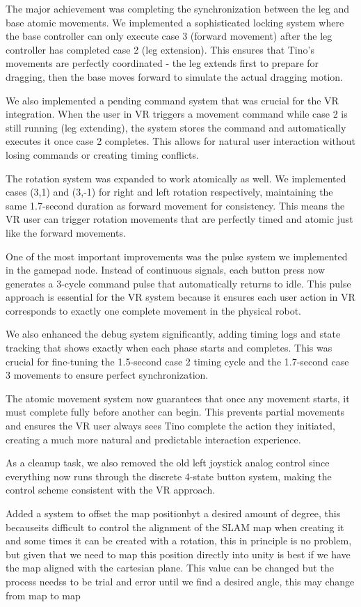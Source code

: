 The major achievement was completing the synchronization between the leg and base atomic movements. We implemented a sophisticated locking system where the base controller can only execute case 3 (forward movement) after the leg controller has completed case 2 (leg extension). This ensures that Tino's movements are perfectly coordinated - the leg extends first to prepare for dragging, then the base moves forward to simulate the actual dragging motion.

We also implemented a pending command system that was crucial for the VR integration. When the user in VR triggers a movement command while case 2 is still running (leg extending), the system stores the command and automatically executes it once case 2 completes. This allows for natural user interaction without losing commands or creating timing conflicts.

The rotation system was expanded to work atomically as well. We implemented cases (3,1) and (3,-1) for right and left rotation respectively, maintaining the same 1.7-second duration as forward movement for consistency. This means the VR user can trigger rotation movements that are perfectly timed and atomic just like the forward movements.

One of the most important improvements was the pulse system we implemented in the gamepad node. Instead of continuous signals, each button press now generates a 3-cycle command pulse that automatically returns to idle. This pulse approach is essential for the VR system because it ensures each user action in VR corresponds to exactly one complete movement in the physical robot.

We also enhanced the debug system significantly, adding timing logs and state tracking that shows exactly when each phase starts and completes. This was crucial for fine-tuning the 1.5-second case 2 timing cycle and the 1.7-second case 3 movements to ensure perfect synchronization.

The atomic movement system now guarantees that once any movement starts, it must complete fully before another can begin. This prevents partial movements and ensures the VR user always sees Tino complete the action they initiated, creating a much more natural and predictable interaction experience.

As a cleanup task, we also removed the old left joystick analog control since everything now runs through the discrete 4-state button system, making the control scheme consistent with the VR approach.


Added a system to offset the map positionbyt a desired amount of degree, this becauseits difficult to control the alignment of the SLAM map when creating it and some times it can be created with a rotation, this in principle is no problem, but given that we need to map this position directly into unity is best if we have the map aligned with the cartesian plane. This value can be changed but the process needss to be trial and error until we find a desired angle, this may change from map to map